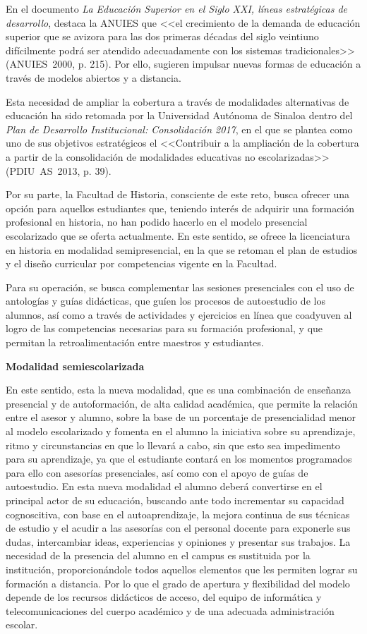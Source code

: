 En el documento \textit{La Educación Superior en el Siglo XXI, líneas
estratégicas de  desarrollo}, destaca la ANUIES que <<el crecimiento de la
demanda de educación superior que se avizora  para las dos primeras décadas
del siglo veintiuno difícilmente podrá ser atendido  adecuadamente con los
sistemas tradicionales>> (ANUIES~2000, p. 215). Por ello, sugieren impulsar
nuevas formas de educación a través de modelos abiertos y a distancia. 

Esta necesidad de ampliar la cobertura a través de modalidades alternativas
de educación ha sido retomada por la Universidad Autónoma de Sinaloa
dentro del \textit{Plan de Desarrollo Institucional: Consolidación 2017},
en el que se plantea como uno de sus objetivos estratégicos el <<Contribuir
a la ampliación de la cobertura a partir de la consolidación de modalidades
educativas no escolarizadas>> (PDIU~AS~2013, p. 39). 

Por su parte, la Facultad de Historia, consciente de este reto, busca ofrecer
una opción para aquellos estudiantes que, teniendo interés de adquirir una
formación profesional en historia, no han podido hacerlo en el modelo
presencial escolarizado que se oferta actualmente.  En este sentido, se
ofrece la licenciatura en historia en modalidad semipresencial, en la que
se retoman el plan de estudios y el diseño curricular por competencias
vigente en la Facultad.

Para su operación, se busca complementar las sesiones presenciales con el
uso de antologías y guías didácticas, que guíen los procesos de autoestudio
de los alumnos, así como a través de actividades y ejercicios en línea que
coadyuven al logro de las competencias necesarias para su formación
profesional, y que permitan la retroalimentación entre maestros y
estudiantes. 
\newpage

\textbf{Modalidad semiescolarizada}

En este sentido, esta la nueva modalidad, que  es una combinación de enseñanza presencial y de autoformación, de alta calidad académica, que permite la relación entre el
asesor y alumno, sobre la base de un porcentaje de presencialidad menor al
modelo escolarizado y fomenta en el alumno la iniciativa sobre su
aprendizaje, ritmo y circunstancias en que lo llevará a cabo, sin que esto
sea impedimento para su aprendizaje, ya que el estudiante contará en los
momentos programados para ello con asesorías presenciales, así como con el
apoyo de guías de autoestudio. En esta nueva modalidad el alumno deberá
convertirse en el principal actor de su educación, buscando ante todo
incrementar su capacidad cognoscitiva, con base en el autoaprendizaje, la
mejora continua de sus técnicas de estudio y el acudir a las asesorías con
el personal docente para exponerle sus dudas, intercambiar ideas,
experiencias y opiniones y presentar sus trabajos. La necesidad de la
presencia del alumno en el campus es sustituida por la institución,
proporcionándole todos aquellos elementos que les permiten lograr su
formación a distancia. Por lo que el grado de apertura y flexibilidad del
modelo depende de los recursos didácticos de acceso, del equipo de
informática y telecomunicaciones del cuerpo académico y de una adecuada
administración escolar.

